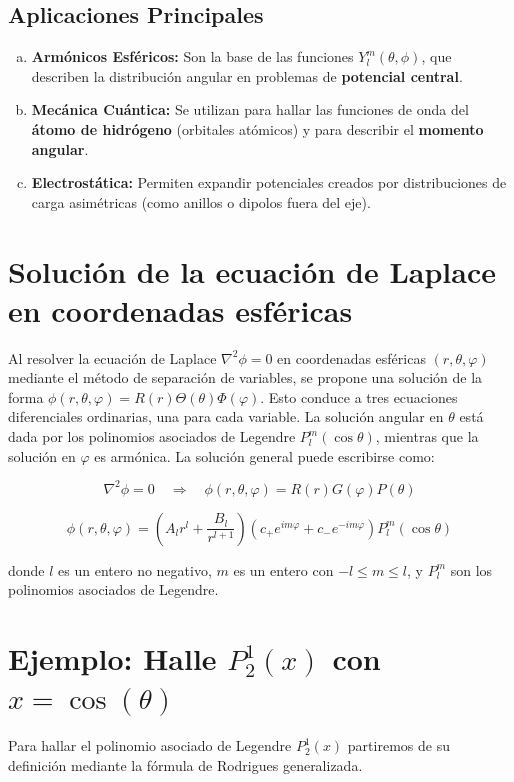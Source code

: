 \documentclass[a4paper]{article}
\begin{document}
\subsection{Aplicaciones Principales}
\begin{enumerate}[a)]
    \item \textbf{Armónicos Esféricos:} Son la base de las funciones $Y_l^m(\theta, \phi)$, que describen la distribución angular en problemas de \textbf{potencial central}.
    \item \textbf{Mecánica Cuántica:} Se utilizan para hallar las funciones de onda del \textbf{átomo de hidrógeno} (orbitales atómicos) y para describir el \textbf{momento angular}.
    \item \textbf{Electrostática:} Permiten expandir potenciales creados por distribuciones de carga asimétricas (como anillos o dipolos fuera del eje).
\end{enumerate}


\section{Solución de la ecuación de Laplace en coordenadas esféricas}

Al resolver la ecuación de Laplace $\nabla^2\phi = 0$ en coordenadas esféricas $(r, \theta, \varphi)$ mediante el método de separación de variables, se propone una solución de la forma $\phi(r, \theta, \varphi) = R(r) \Theta(\theta) \Phi(\varphi)$. Esto conduce a tres ecuaciones diferenciales ordinarias, una para cada variable. La solución angular en $\theta$ está dada por los polinomios asociados de Legendre $P_l^m(\cos \theta)$, mientras que la solución en $\varphi$ es armónica. La solución general puede escribirse como:

$$
\nabla^2\phi = 0 \quad \Longrightarrow \quad \phi(r,\theta,\varphi) = R(r) G(\varphi) P(\theta)
$$

$$
\phi(r, \theta, \varphi) = \left( A_l r^l + \frac{B_l}{r^{l+1}} \right) \left( c_+ e^{im\varphi} + c_- e^{-im\varphi} \right) P_l^m(\cos \theta)
$$

donde $l$ es un entero no negativo, $m$ es un entero con $-l \leq m \leq l$, y $P_l^m$ son los polinomios asociados de Legendre.


\section{Ejemplo: Halle $P_2^1(x)$ con $x = \cos(\theta)$}

Para hallar el polinomio asociado de Legendre $P_2^1(x)$ partiremos de su definición mediante la fórmula de Rodrigues generalizada.
\end{document}
